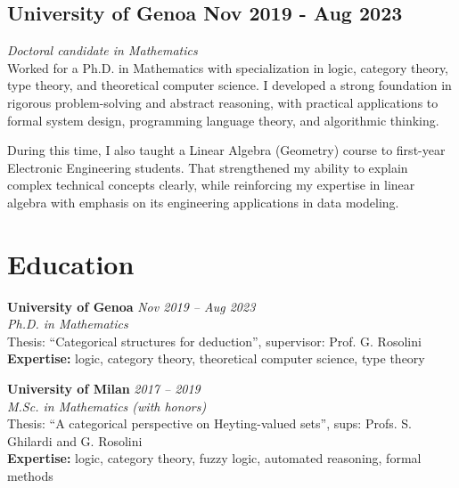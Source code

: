 \documentclass[a4paper,11pt]{article}
\begin{document}
\subsection*{University of Genoa \hfill Nov 2019 - Aug 2023}
\textit{Doctoral candidate in Mathematics}\\
Worked for a Ph.D. in Mathematics with specialization in logic, category theory, type theory, and theoretical computer science. I developed a strong foundation in rigorous problem-solving and abstract reasoning, with practical applications to formal system design, programming language theory, and algorithmic thinking.

During this time, I also taught a Linear Algebra (Geometry) course to first-year Electronic Engineering students. That strengthened my ability to explain complex technical concepts clearly, while reinforcing my expertise in linear algebra with emphasis on its engineering applications in data modeling.


\newpage

\section*{ Education}
\textbf{University of Genoa} \hfill \textit{Nov 2019 -- Aug 2023} \\
\textit{Ph.D. in Mathematics} \\
Thesis: ``Categorical structures for deduction'', supervisor: Prof. G. Rosolini \\
\textbf{Expertise:} logic, category theory, theoretical computer science, type theory 

\textbf{University of Milan} \hfill \textit{2017 -- 2019} \\
\textit{M.Sc. in Mathematics (with honors)} \\
Thesis: ``A categorical perspective on Heyting-valued sets'', sups: Profs. S. Ghilardi and G. Rosolini \\
\textbf{Expertise:} logic, category theory, fuzzy logic, automated reasoning, formal methods
\end{document}
